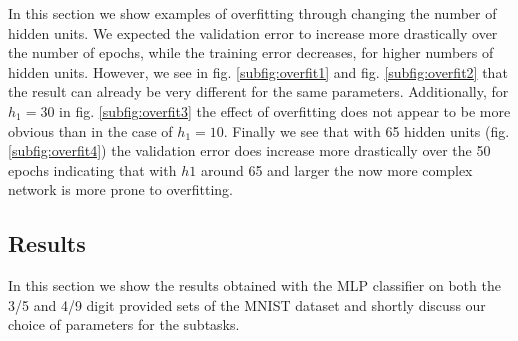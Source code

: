 In this section we show examples of overfitting through changing the number of hidden units. We expected the validation error to increase more drastically over the number of epochs, while the training error decreases, for higher numbers of hidden units. However, we see in fig. \ref{subfig:overfit1} and fig. \ref{subfig:overfit2} that the result can already be very different for the same parameters. Additionally, for $h_1=30$ in fig. \ref{subfig:overfit3} the effect of overfitting does not appear to be more obvious than in the case of $h_1=10$. Finally we see that with 65 hidden units (fig. \ref{subfig:overfit4}) the validation error does increase more drastically over the 50 epochs indicating that with $h1$ around 65 and larger the now more complex network is more prone to overfitting.

\subsection{Results}
	In this section we show the results obtained with the MLP classifier on both the 3/5 and 4/9 digit provided sets of the MNIST dataset and shortly discuss our choice of parameters for the subtasks.
